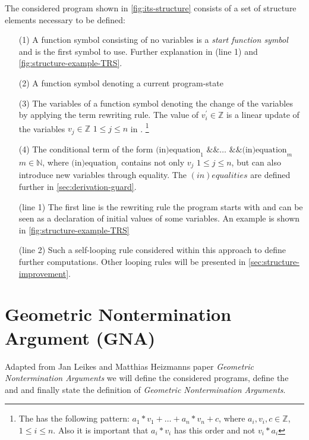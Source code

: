 The considered program shown in \autoref{fig:its-structure} consists of a set of structure elements necessary to be defined:
\begin{enumerate}[leftmargin=1]
	\item[(1)] A function symbol consisting of no variables is a \textit{start function symbol} and is the first symbol to use. Further explanation in (line 1) and \autoref{fig:structure-example-TRS}.
	\item[(2)] A function symbol denoting a current program-state
	\item[(3)] The variables of a function symbol denoting the change of the variables by applying the term rewriting rule. The value of $v^\prime_i \in \mathbb{Z}$ is a linear update of the variables $v_j \in \mathbb{Z}$ $1 \le j \le n$ in \stdLinInt. \footnote{The \stdLinInt has the following pattern: $ a_1*v_1 + \dots + a_n*v_n + c$, where $a_i , v_i, c \in \mathbb{Z}$, $1 \le i\le n$. 
		Also it is important that $a_i * v_i$ has this order and not $v_i*a_i$} 
	\item[(4)] The conditional term of the form $\text{(in)equation}_1 \text{ \&\& } \dots \text{ \&\& } \text{(in)equation}_m$ $m \in \mathbb{N}$, where $\text{(in)equation}_i$ contains not only $v_j$ $1 \le j \le n$, but can also introduce new variables through equality. The $(in)equalities$ are defined further in \autoref{sec:derivation-guard}.
	\item[(line 1)] The first line is the rewriting rule the program starts with and can be seen as a declaration of initial values of some variables. An example is shown in \autoref{fig:structure-example-TRS}
	\item[(line 2)] Such a self-looping rule considered within this approach to define further computations. Other looping rules will be presented in \autoref{sec:structure-improvement}.
\end{enumerate} 


\section{Geometric Nontermination Argument (GNA)}
Adapted from Jan Leikes and Matthias Heizmanns paper \textit{Geometric Nontermination Arguments} \cite{leike2014geometric} we will define the considered programs, define the \stem and \loopt and finally state the definition of \textit{Geometric Nontermination Arguments}.

